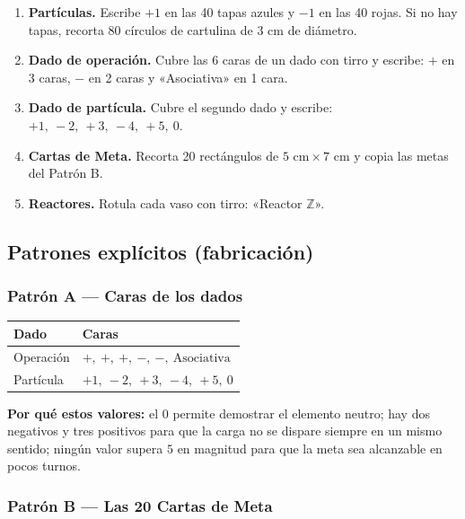 \documentclass[12pt, letterpaper]{article}
\newcommand{\Z}{\mathbb{Z}}
\begin{document}
\begin{enumerate}[leftmargin=*]
  \item \textbf{Partículas.} Escribe $+1$ en las 40 tapas azules y $-1$ en las 40 rojas. Si no hay tapas, recorta 80 círculos de cartulina de $3$ cm de diámetro.
  \item \textbf{Dado de operación.} Cubre las 6 caras de un dado con tirro y escribe: $+$ en 3 caras, $-$ en 2 caras y «Asociativa» en 1 cara.
  \item \textbf{Dado de partícula.} Cubre el segundo dado y escribe: $+1,\ -2,\ +3,\ -4,\ +5,\ 0$.
  \item \textbf{Cartas de Meta.} Recorta 20 rectángulos de $5\text{ cm}\times 7\text{ cm}$ y copia las metas del Patrón B.
  \item \textbf{Reactores.} Rotula cada vaso con tirro: «Reactor $\Z$».
\end{enumerate}

\subsection{Patrones explícitos (fabricación)}

\subsubsection{Patrón A — Caras de los dados}

\begin{center}
\small
\begin{tabular}{@{}l l@{}}
\toprule
\textbf{Dado} & \textbf{Caras}\\
\midrule
Operación & $+,\ +,\ +,\ -,\ -,\ \text{Asociativa}$\\
Partícula & $+1,\ -2,\ +3,\ -4,\ +5,\ 0$\\
\bottomrule
\end{tabular}
\end{center}

\textbf{Por qué estos valores:} el $0$ permite demostrar el elemento neutro; hay dos negativos y tres positivos para que la carga no se dispare siempre en un mismo sentido; ningún valor supera $5$ en magnitud para que la meta sea alcanzable en pocos turnos.

\subsubsection{Patrón B — Las 20 Cartas de Meta}
\end{document}
